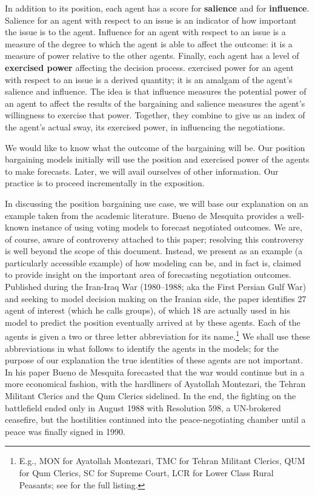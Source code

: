 In addition to its   {position}, each agent has a score for {\bf  {salience}} and for {\bf  {influence}}. Salience  for an agent with respect to an issue is an indicator of how important the issue is to the agent. Influence for an agent with respect to an issue is a measure of the degree to which the agent is able to affect the outcome: it is a measure of power relative to the other agents.
Finally, each agent has a level of {\bf  {exercised power}} affecting the decision process.   {exercised power} for an agent with respect to an issue is a derived quantity; it is an amalgam of the agent's   {salience} and    {influence}.
The idea is that   {influence} measures the potential power of an agent to affect the results of the bargaining and   {salience} measures the agent's willingness to exercise that power. Together, they combine to give us an index of the agent's actual sway, its   {exercised power}, in influencing the negotiations.


We would like to know what the outcome of the bargaining will be. Our position bargaining models initially will use the   {position} and   {exercised power}  of the agents to make forecasts. Later, we will avail ourselves of other information. Our practice is to proceed incrementally in the exposition.

In discussing the  position bargaining use case, we will base our explanation on an example taken from the academic literature. Bueno de Mesquita 
 \cite{mesquita_1984} provides a well-known instance of using  voting models to   {forecast} negotiated outcomes. We are, of course, aware of controversy attached to this paper; resolving this controversy is well beyond the scope of this document. Instead, we present \cite{mesquita_1984} as an example (a particularly accessible example)  of how modeling can be, and in fact is, claimed to provide insight on the important area of forecasting negotiation outcomes. Published during the Iran-Iraq War (1980--1988; aka the First Persian Gulf War) and seeking to model decision making on the Iranian side, the paper identifies 27   {agent} of interest (which he calls groups), of which 18 are actually used in his model to predict the   {position} eventually arrived at by these agents.
  Each of the agents is given a two or three letter abbreviation for its name.\footnote{E.g., MON for Ayatollah Montezari, TMC for Tehran Militant Clerics,  QUM  for Qum Clerics, SC for Supreme Court, LCR for Lower Class Rural Peasants; see \cite[Table 1]{mesquita_1984} for the full listing.} We shall use these abbreviations in what follows to identify the  agents in the models; for the purpose of our explanation the true identities of these agents are not important.  In his paper Bueno de Mesquita forecasted that the war would continue but in a more economical fashion, with the hardliners of Ayatollah Montezari, the Tehran Militant Clerics and the Qum Clerics sidelined. In the end, the fighting on the battlefield ended only in August 1988 with Resolution 598, a UN-brokered ceasefire, but the hostilities continued into the peace-negotiating chamber until a peace was finally signed in 1990.

